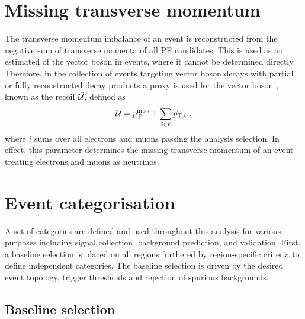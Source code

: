 \section{Missing transverse momentum}

The transverse momentum imbalance of an event is reconstructed from the
negative sum of transverse momenta of all PF candidates. This is used as an
estimated of the vector boson \pt in \IZvvj events, where it cannot be
determined directly. Therefore, in the collection of events targeting vector
boson decays with partial or fully reconstructed decay products a proxy is
used for the vector boson \vecpt, known as the recoil $\vec{\mathcal{U}}$, defined
as
%
\begin{equation}
    \vec{\mathcal{U}} = \vec{p}_{\mathrm{T}}^{\mathrm{miss}} + \sum_{i\in\ell} \vec{p}_{\mathrm{T},i}\ ,
\end{equation}
%
where $i$ sums over all electrons and muons passing the analysis selection. In
effect, this parameter determines the missing transverse momentum of an event
treating electrons and muons as neutrinos.


\section{Event categorisation}

A set of categories are defined and used throughout this analysis for various
purposes including signal collection, background prediction, and validation.
First, a baseline selection is placed on all regions furthered by
region-specific criteria to define independent categories. The baseline
selection is driven by the desired event topology, trigger thresholds and
rejection of spurious \ptmiss backgrounds.


\subsection{Baseline selection}\label{sec:baseline-selection}

